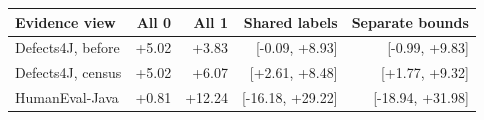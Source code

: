 \begin{tabularx}{\linewidth}{Yrrrr}
\toprule
Evidence view & All 0 & All 1 & Shared labels & Separate bounds \\
\midrule
Defects4J, before & +5.02 & +3.83 & [-0.09, +8.93] & [-0.99, +9.83] \\
Defects4J, census & +5.02 & +6.07 & [+2.61, +8.48] & [+1.77, +9.32] \\
HumanEval-Java & +0.81 & +12.24 & [-16.18, +29.22] & [-18.94, +31.98] \\
\bottomrule
\end{tabularx}
